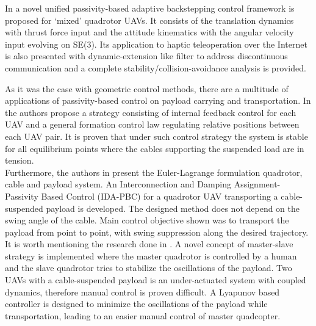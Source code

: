In \cite{passivity-backstepping}  a novel unified passivity-based adaptive backstepping control framework is proposed for ‘mixed’ quadrotor UAVs. It consists of the translation dynamics with thrust force input and the attitude kinematics with the angular velocity input evolving on SE(3). Its application to haptic teleoperation over the Internet is also presented with dynamic-extension like filter to address discontinuous communication and a complete stability/collision-avoidance analysis is provided.

As it was the case with geometric control methods, there are a multitude of applications of passivity-based control on payload carrying and transportation. In \cite{passivity-based-formation-load} the authors propose a strategy consisting of internal feedback control for each UAV and a general formation control law regulating relative positions between each UAV pair. It is proven that under such control strategy the system is stable for all equilibrium points where the cables supporting the suspended load are in tension. \\
\noindent Furthermore, the authors in \cite{passivity-based-payload-minimum-swing} present the Euler-Lagrange formulation quadrotor, cable and payload system. An Interconnection and Damping Assignment-Passivity Based Control (IDA-PBC) for a quadrotor UAV transporting a cable-suspended payload is developed. The designed method does not depend on the swing angle of the cable. Main control objective shown was to transport the payload from point to point, with swing suppression along the desired trajectory. \\ 
It is worth mentioning the research done in \cite{payload-and-human}. A novel concept of master-slave strategy is implemented where the  master  quadrotor  is  controlled  by a human  and  the slave quadrotor tries to stabilize the oscillations of the payload. Two  UAVs with a cable-suspended  payload  is an under-actuated system with coupled dynamics, therefore manual control is proven difficult. A Lyapunov based  controller is designed to  minimize  the  oscillations  of  the  payload while  transportation,  leading  to  an  easier  manual  control  of master quadcopter.

